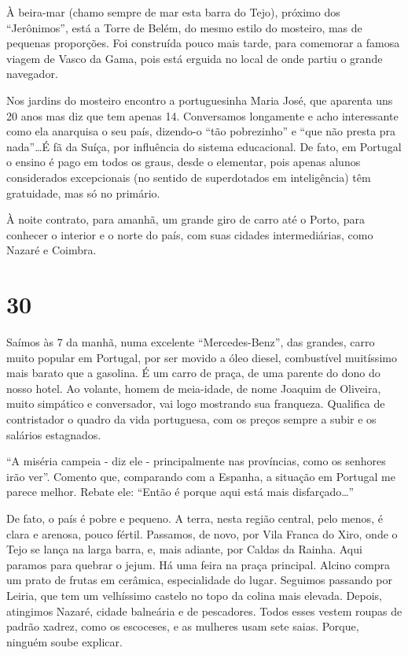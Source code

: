À beira-mar (chamo sempre de mar esta barra do Tejo), próximo dos “Jerônimos”, está a Torre de Belém, do mesmo estilo do mosteiro, mas de pequenas proporções. Foi construída pouco mais tarde, para comemorar a famosa viagem de Vasco da Gama, pois está erguida no local de onde partiu o grande navegador.

Nos jardins do mosteiro encontro a portuguesinha Maria José, que aparenta uns 20 anos mas diz que tem apenas 14. Conversamos longamente e acho interessante como ela anarquisa o seu país, dizendo-o “tão pobrezinho” e “que não presta pra nada”\ldots É fã da Suíça, por influência do sistema educacional. De fato, em Portugal o ensino é pago em todos os graus, desde o elementar, pois apenas alunos considerados excepcionais (no sentido de superdotados em inteligência) têm gratuidade, mas só no primário.

À noite contrato, para amanhã, um grande giro de carro até o Porto, para conhecer o interior e o norte do país, com suas cidades intermediárias, como Nazaré e Coimbra.

\section*{30 \adfflatleafright {}}
Saímos às 7 da manhã, numa excelente “Mercedes-Benz”, das grandes, carro muito popular em Portugal, por ser movido a óleo diesel, combustível muitíssimo mais barato que a gasolina. É um carro de praça, de uma parente do dono do nosso hotel. Ao volante, homem de meia-idade, de nome Joaquim de Oliveira, muito simpático e conversador, vai logo mostrando sua franqueza. Qualifica de contristador o quadro da vida portuguesa, com os preços sempre a subir e os salários estagnados.

“A miséria campeia - diz ele - principalmente nas províncias, como os senhores irão ver”. Comento que, comparando com a Espanha, a situação em Portugal me parece melhor. Rebate ele: “Então é porque aqui está mais disfarçado\ldots”

De fato, o país é pobre e pequeno. A terra, nesta região central, pelo menos, é clara e arenosa, pouco fértil. Passamos, de novo, por Vila Franca do Xiro, onde o Tejo se lança na larga barra, e, mais adiante, por Caldas da Rainha. Aqui paramos para quebrar o jejum. Há uma feira na praça principal. Alcino compra um prato de frutas em cerâmica, especialidade do lugar. Seguimos passando por Leiria, que tem um velhíssimo castelo no topo da colina mais elevada. Depois, atingimos Nazaré, cidade balneária e de pescadores. Todos esses vestem roupas de padrão xadrez, como os escoceses, e as mulheres usam sete saias. Porque, ninguém soube explicar.

